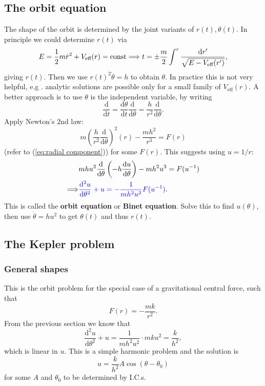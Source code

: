\subsection{The orbit equation}
The shape of the orbit is determined by the joint variants of $ r(t),\theta(t) $. In principle we could determine $r(t)$ via 
\[
    E=\frac{1}{2}m \dot{r}^2+V_{\text{eff}}(r)=\text{const} \Longrightarrow t = \pm \frac{m}{2}\int^{r} \frac{\mathrm{d} r'}{\sqrt{E-V_{\text{eff}}(r')}},
\]
giving $r(t)$. Then we use $ r(t)^2 \dot{\theta}=h $ to obtain $\theta$. In practice this is not very helpful, e.g . analytic solutions are possible only for a small family of $ V_{\text{eff}}(r) $. A better approach is to use $ \theta $ is the independent variable, by writing
\[
    \frac{\mathrm{d}}{\mathrm{d}t} = \frac{\mathrm{d}\theta}{\mathrm{d}t}\frac{\mathrm{d}}{\mathrm{d}\theta} = \frac{h}{r^2}\frac{\mathrm{d}}{\mathrm{d}\theta}.    
\]
Apply Newton's 2nd law: 
\[
    m \left( \frac{h}{r^2}\frac{\mathrm{d}}{\mathrm{d}\theta} \right)^2(r)-\frac{mh^2}{r^3}=F(r)
\]
(refer to (\ref{eq:radial component})) for some $F(r)$. This suggests using $u=1/r$: 
\begin{align*}
    &mhu^2 \frac{\mathrm{d}}{\mathrm{d}\theta}\left( -h \frac{\mathrm{d}u}{\mathrm{d}\theta}  \right) -mh^2u^3=F(u^{-1})\\ 
    \Longrightarrow & {\color{blue}\frac{\mathrm{d}^2 u}{\mathrm{d}\theta^2}+u = -\frac{1}{mh^2u^2} F(u^{-1})}.
\end{align*}
This is called the \textbf{orbit equation} or \textbf{Binet equation}. Solve this to find $ u(\theta) $, then use $ \dot{\theta} = hu^2 $ to get $ \theta(t) $ and thus $ r(t) $.

\subsection{The Kepler problem}
\subsubsection*{General shapes}
This is the orbit problem for the special case of a gravitational central force, such that 
\[
    F(r) = -\frac{mk}{r^2}.
\]
From the previous section we know that 
\[
    \frac{\mathrm{d}^2 u}{\mathrm{d}\theta^2}+u = \frac{1}{mh^2u^2} \cdot mku^2 = \frac{k}{h^2},
\]
which is linear in $u$. This is a simple harmonic problem and the solution is 
\[
    u = \frac{k}{h^2}A \cos (\theta-\theta_0)
\]
for some $A$ and $ \theta_0 $ to be determined by I.C.s. 

